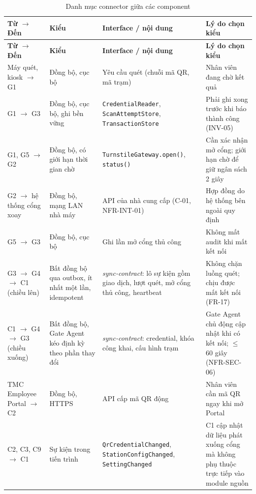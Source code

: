 \begingroup
\small
\renewcommand{\arraystretch}{1.3}
\begin{longtable}{|>{\raggedright\arraybackslash}p{2.9cm}|>{\raggedright\arraybackslash}p{3.1cm}|>{\raggedright\arraybackslash}p{4.9cm}|>{\raggedright\arraybackslash}p{4.4cm}|}
\caption{Danh mục connector giữa các component}\label{tab:connectors}\\
\hline
\textbf{Từ $\rightarrow$ Đến} & \textbf{Kiểu} & \textbf{Interface / nội dung} & \textbf{Lý do chọn kiểu} \\
\hline
\endfirsthead
\hline
\textbf{Từ $\rightarrow$ Đến} & \textbf{Kiểu} & \textbf{Interface / nội dung} & \textbf{Lý do chọn kiểu} \\
\hline
\endhead
\hline
\endfoot
\endlastfoot
Máy quét, kiosk $\rightarrow$ G1 & Đồng bộ, cục bộ & Yêu cầu quét (chuỗi mã QR, mã trạm) & Nhân viên đang chờ kết quả \\
\hline
G1 $\rightarrow$ G3 & Đồng bộ, cục bộ, ghi bền vững & \texttt{CredentialReader}, \texttt{ScanAttemptStore}, \texttt{TransactionStore} & Phải ghi xong trước khi báo thành công (INV-05) \\
\hline
G1, G5 $\rightarrow$ G2 & Đồng bộ, có giới hạn thời gian chờ & \texttt{TurnstileGateway.open()}, \texttt{status()} & Cần xác nhận mở cổng; giới hạn chờ để giữ ngân sách 2 giây \\
\hline
G2 $\rightarrow$ hệ thống cổng xoay & Đồng bộ, mạng LAN nhà máy & API của nhà cung cấp (C-01, NFR-INT-01) & Hợp đồng do hệ thống bên ngoài quy định \\
\hline
G5 $\rightarrow$ G3 & Đồng bộ, cục bộ & Ghi lần mở cổng thủ công & Không mất audit khi mất kết nối \\
\hline
G3 $\rightarrow$ G4 $\rightarrow$ C1 (chiều lên) & Bất đồng bộ qua outbox, ít nhất một lần, idempotent & \textit{sync-contract}: lô sự kiện gồm giao dịch, lượt quét, mở cổng thủ công, heartbeat & Không chặn luồng quét; chịu được mất kết nối (FR-17) \\
\hline
C1 $\rightarrow$ G4 $\rightarrow$ G3 (chiều xuống) & Bất đồng bộ, Gate Agent kéo định kỳ theo phần thay đổi & \textit{sync-contract}: credential, khóa công khai, cấu hình trạm & Gate Agent chủ động cập nhật khi có kết nối; $\le$ 60 giây (NFR-SEC-06) \\
\hline
TMC Employee Portal $\rightarrow$ C2 & Đồng bộ, HTTPS & API cấp mã QR động & Nhân viên cần mã QR ngay khi mở Portal \\
\hline
C2, C3, C9 $\rightarrow$ C1 & Sự kiện trong tiến trình & \texttt{QrCredentialChanged}, \texttt{StationConfigChanged}, \texttt{SettingChanged} & C1 cập nhật dữ liệu phát xuống cổng mà không phụ thuộc trực tiếp vào module nguồn \\

\end{longtable}
